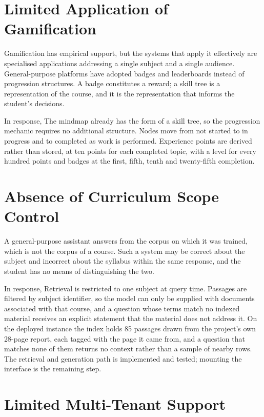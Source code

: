 \section{Limited Application of Gamification}

Gamification has empirical support, but the systems that apply it effectively are specialised applications addressing a single subject and a single audience. General-purpose platforms have adopted badges and leaderboards instead of progression structures. A badge constitutes a reward; a skill tree is a representation of the course, and it is the representation that informs the student's decisions.

In response, The mindmap already has the form of a skill tree, so the progression mechanic requires no additional structure. Nodes move from not started to in progress and to completed as work is performed. Experience points are derived rather than stored, at ten points for each completed topic, with a level for every hundred points and badges at the first, fifth, tenth and twenty-fifth completion.

\section{Absence of Curriculum Scope Control}

A general-purpose assistant answers from the corpus on which it was trained, which is not the corpus of a course. Such a system may be correct about the subject and incorrect about the syllabus within the same response, and the student has no means of distinguishing the two.

In response, Retrieval is restricted to one subject at query time. Passages are filtered by subject identifier, so the model can only be supplied with documents associated with that course, and a question whose terms match no indexed material receives an explicit statement that the material does not address it. On the deployed instance the index holds 85 passages drawn from the project's own 28-page report, each tagged with the page it came from, and a question that matches none of them returns no context rather than a sample of nearby rows. The retrieval and generation path is implemented and tested; mounting the interface is the remaining step.

\section{Limited Multi-Tenant Support}

